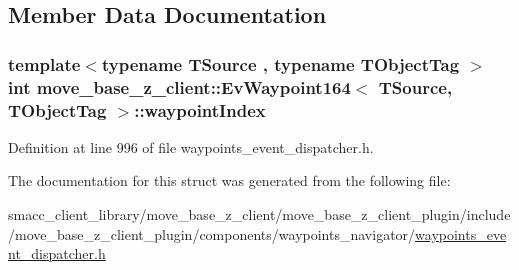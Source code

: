 \subsection{Member Data Documentation}
\subsubsection[{\texorpdfstring{waypoint\+Index}{waypointIndex}}]{\setlength{\rightskip}{0pt plus 5cm}template$<$typename T\+Source , typename T\+Object\+Tag $>$ int {\bf move\+\_\+base\+\_\+z\+\_\+client\+::\+Ev\+Waypoint164}$<$ T\+Source, T\+Object\+Tag $>$\+::waypoint\+Index}\hypertarget{structmove__base__z__client_1_1EvWaypoint164_acdb61955ec791f89f1906789b80be87c}{}\label{structmove__base__z__client_1_1EvWaypoint164_acdb61955ec791f89f1906789b80be87c}


Definition at line 996 of file waypoints\+\_\+event\+\_\+dispatcher.\+h.



The documentation for this struct was generated from the following file\+:\begin{DoxyCompactItemize}
\item 
smacc\+\_\+client\+\_\+library/move\+\_\+base\+\_\+z\+\_\+client/move\+\_\+base\+\_\+z\+\_\+client\+\_\+plugin/include/move\+\_\+base\+\_\+z\+\_\+client\+\_\+plugin/components/waypoints\+\_\+navigator/\hyperlink{waypoints__event__dispatcher_8h}{waypoints\+\_\+event\+\_\+dispatcher.\+h}\end{DoxyCompactItemize}
